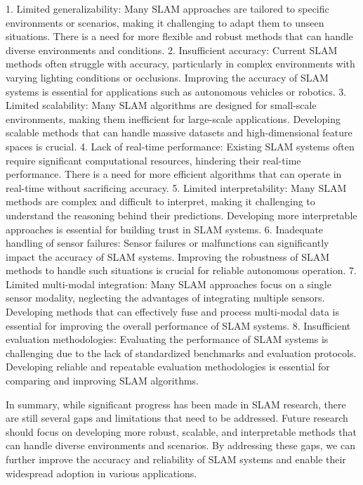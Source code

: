 \documentclass[conference]{IEEEtran}
\begin{document}
1. Limited generalizability: Many SLAM approaches are tailored to specific environments or scenarios, making it challenging to adapt them to unseen situations. There is a need for more flexible and robust methods that can handle diverse environments and conditions. \cite{limitation1}
2. Insufficient accuracy: Current SLAM methods often struggle with accuracy, particularly in complex environments with varying lighting conditions or occlusions. Improving the accuracy of SLAM systems is essential for applications such as autonomous vehicles or robotics. \cite{limitation2}
3. Limited scalability: Many SLAM algorithms are designed for small-scale environments, making them inefficient for large-scale applications. Developing scalable methods that can handle massive datasets and high-dimensional feature spaces is crucial. \cite{limitation3}
4. Lack of real-time performance: Existing SLAM systems often require significant computational resources, hindering their real-time performance. There is a need for more efficient algorithms that can operate in real-time without sacrificing accuracy. \cite{limitation4}
5. Limited interpretability: Many SLAM methods are complex and difficult to interpret, making it challenging to understand the reasoning behind their predictions. Developing more interpretable approaches is essential for building trust in SLAM systems. \cite{limitation5}
6. Inadequate handling of sensor failures: Sensor failures or malfunctions can significantly impact the accuracy of SLAM systems. Improving the robustness of SLAM methods to handle such situations is crucial for reliable autonomous operation. \cite{limitation6}
7. Limited multi-modal integration: Many SLAM approaches focus on a single sensor modality, neglecting the advantages of integrating multiple sensors. Developing methods that can effectively fuse and process multi-modal data is essential for improving the overall performance of SLAM systems. \cite{limitation7}
8. Insufficient evaluation methodologies: Evaluating the performance of SLAM systems is challenging due to the lack of standardized benchmarks and evaluation protocols. Developing reliable and repeatable evaluation methodologies is essential for comparing and improving SLAM algorithms. \cite{limitation8}

In summary, while significant progress has been made in SLAM research, there are still several gaps and limitations that need to be addressed. Future research should focus on developing more robust, scalable, and interpretable methods that can handle diverse environments and scenarios. By addressing these gaps, we can further improve the accuracy and reliability of SLAM systems and enable their widespread adoption in various applications.
\end{document}
